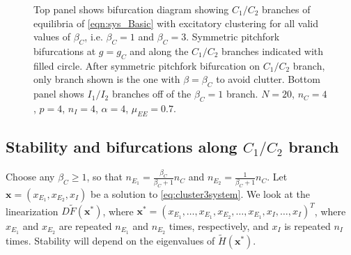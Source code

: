 \documentclass[11pt,reqno]{amsart}
\newcommand{\xvec}{\mathbf{x}}
\begin{document}
\begin{figure}
\begin{tabular}{cc}
    \end{tabular}
    \caption{Top panel shows bifurcation diagram showing $C_1/C_2$ branches of equilibria of \cref{eqn:sys_Basic} with excitatory clustering for all valid values of $\beta_C$, i.e. $\beta_C =1$ and $\beta_C=3$. Symmetric pitchfork bifurcations at $g = g_C$ and along the $C_1/C_2$ branches indicated with filled circle. After symmetric pitchfork bifurcation on $C_1/C_2$ branch, only branch shown is the one with $\beta=\beta_C$ to avoid clutter. Bottom panel shows $I_1/I_2$ branches off of the $\beta_C = 1$ branch. $N = 20$, $n_C = 4$, $p = 4$, $n_I = 4$, $\alpha = 4$, $\mu_{EE} = 0.7$.}
    \label{fig:clusterBD1}
\end{figure}

\subsection{Stability and bifurcations along $C_1/C_2$ branch}

Choose any $\beta_C \geq 1$, so that $n_{E_1} = \frac{\beta_C}{\beta_C+1}n_C$ and $n_{E_2} = \frac{1}{\beta_C+1}n_C$. Let $\xvec = (x_{E_1}, x_{E_2}, x_{I})$ be a solution to \cref{eq:cluster3system}. We look at the linearization $D\tilde{F}(\xvec^*)$, where $\xvec^* = (x_{E_1}, \dots, x_{E_1}, x_{E_2}, \dots, x_{E_1}, x_{I}, \dots, x_{I})^T$, where $x_{E_1}$ and $x_{E_2}$ are repeated $n_{E_1}$ and $n_{E_2}$ times, respectively, and $x_I$ is repeated $n_I$ times. Stability will depend on the eigenvalues of $\tilde{H}(\xvec^*)$. 
\end{document}
